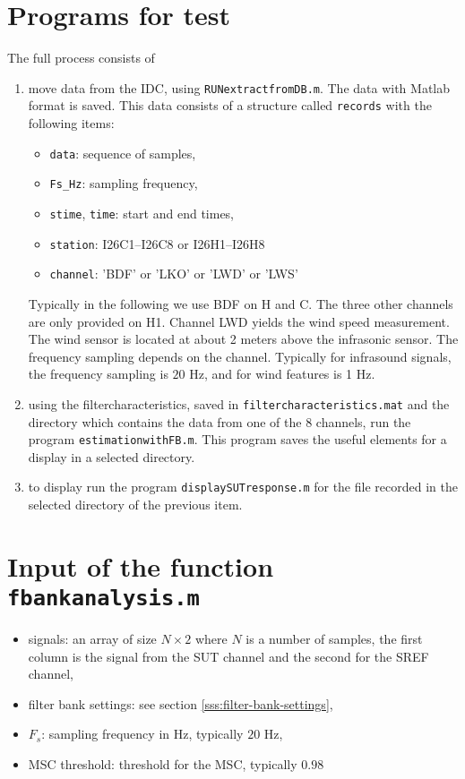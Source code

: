

\section{Programs for test}
The full process consists of
\begin{enumerate}
\item
 move data from the IDC, using {\tt RUNextractfromDB.m}. The data with Matlab format is saved. This data consists of a structure called {\tt records} with the following items:
 \begin{itemize}
 \item
{\tt data}: sequence of samples,
 \item
{\tt Fs\_Hz}: sampling frequency,
\item
{\tt stime}, {\tt time}: start and end times, 
\item
{\tt station}: I26C1--I26C8 or I26H1--I26H8
\item
{\tt channel}: 'BDF' or 'LKO' or 'LWD' or 'LWS'
 \end{itemize}   
Typically in the following we use BDF on H and C.   The three other channels are only provided on H1. Channel LWD yields  the wind speed measurement. The wind sensor is located at about 2 meters above the infrasonic sensor. The frequency sampling depends on the channel. Typically for infrasound signals, the frequency sampling is $20$ Hz, and for wind features is 1 Hz.
    
\item
 using the filtercharacteristics, saved in {\tt filtercharacteristics.mat} and the directory which contains the data from one of the 8 channels, run the program {\tt estimationwithFB.m}. This program saves the useful elements for a display in a selected directory.
 \item
 to display run the program {\tt displaySUTresponse.m} for the file recorded in the selected directory of the previous item.
\end{enumerate}


\section{Input of the function {\tt fbankanalysis.m}}
\begin{itemize}
\item
signals: an array of size $N\times 2$ where $N$ is a number of samples, the first column is the signal from the SUT channel and the second for the SREF channel,
\item
filter bank settings: see section \ref{sss:filter-bank-settings},
\item
$F_s$: sampling frequency in Hz, typically $20$ Hz,
\item
MSC threshold: threshold for the MSC, typically $0.98$
\end{itemize}

